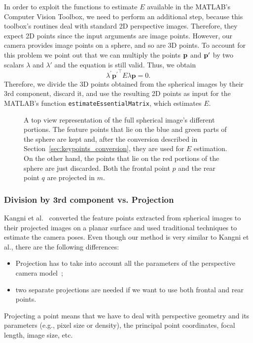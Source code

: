 In order to exploit the functions to estimate $E$ available in the MATLAB's Computer Vision Toolbox, we need to perform an additional step, because this toolbox's routines deal with standard 2D perspective images. Therefore, they expect 
2D points since the input arguments are image points. However, our camera provides image points on a sphere, and so are 3D points. To account for this problem we point out that we can multiply the points $\mathbf{p}$ and $\mathbf{p}'$ by two 
scalars ${\lambda}$ and ${\lambda}'$ and the equation is still valid. Thus, we obtain
\begin{equation*}
\lambda^\prime{\mathbf{p}^\prime}^\top E\lambda\mathbf{p} = 0 \text{.}
\end{equation*}
Therefore, we divide the 3D points obtained from the spherical images by their 
3rd component, discard it, and use the resulting 2D points as input for the 
MATLAB's function {\tt estimateEssentialMatrix}, which estimates $E$.

\begin{figure}
    \centering
    \def\svgwidth{0.8\columnwidth}
    
    \caption{A top view representation of the full spherical image's 
    different portions.
    The feature points that lie on the blue and green parts of the sphere are kept and,
    after the conversion described in Section~\ref{sec:keypoints_conversion},
    they are used for $E$ estimation. On the other hand, the points that lie
    on the red portions of the sphere are just discarded.
    Both the frontal point $p$ and the rear point $q$ are projected in $m$.}
	\label{fig:sphere_division}
\end{figure}

\subsubsection{Division by 3rd component vs. Projection}
%
Kangni et al.~\cite{kangni2007orientation} converted the 
feature points extracted from spherical images to their projected images on a 
planar surface and used traditional techniques to estimate the camera poses.
%
Even though our method is very similar to Kangni et al., there are the following
differences:
\begin{itemize}
	\item Projection has to take into account all the parameters of the
	perspective camera model~\cite{szeliski2010computer};
	\item two separate projections are needed if we want to use both
	frontal and rear points.
\end{itemize}
Projecting a point means that we have to deal with perspective geometry and its
parameters (e.g., pixel size or density), the principal point coordinates, 
focal length, image size, etc.

